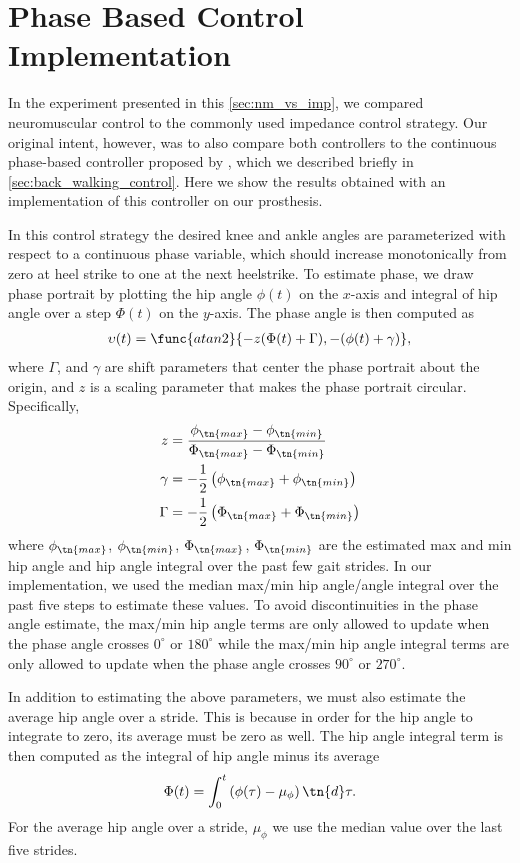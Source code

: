 \section{Phase Based Control Implementation}\label{sec:polar_phase}

In the experiment presented in this \cref{sec:nm_vs_imp}, we compared
neuromuscular control to the commonly used impedance control strategy. Our
original intent, however, was to also compare both controllers to the continuous
phase-based controller proposed by \citet{quintero2016preliminary}, which we
described briefly in \cref{sec:back_walking_control}. Here we show the results
obtained with an implementation of this controller on our prosthesis.

In this control strategy the desired knee and ankle angles are parameterized
with respect to a continuous phase variable, which should increase monotonically
from zero at heel strike to one at the next heelstrike. To estimate phase, we
draw phase portrait by plotting the hip angle $\phi(t)$ on the $x$-axis and
integral of hip angle over a step $\Phi(t)$ on the $y$-axis. The phase angle is
then computed as
\begin{align}
    \upsilon(t) = \func{atan2}{-z(\Phi(t) + \Gamma), -(\phi(t) + \gamma)},
\end{align}
where $\Gamma$, and $\gamma$ are shift parameters that center the phase portrait
about the origin, and $z$ is a scaling parameter that makes the phase portrait
circular. Specifically,
\begin{align}
    z &= \frac{\phi_\tn{max} - \phi_\tn{min}}{\Phi_\tn{max} - \Phi_\tn{min}} \\
    \gamma &= -\frac{1}{2} \left( \phi_\tn{max} + \phi_\tn{min} \right) \\
    \Gamma &= -\frac{1}{2} \left( \Phi_\tn{max} + \Phi_\tn{min} \right)
\end{align}
where $\phi_\tn{max}$, $\phi_\tn{min}$, $\Phi_\tn{max}$, $\Phi_\tn{min}$ are the
estimated max and min hip angle and hip angle integral over the past few gait
strides. In our implementation, we used the median max/min hip angle/angle
integral over the past five steps to estimate these values. To avoid
discontinuities in the phase angle estimate, the max/min hip angle terms are
only allowed to update when the phase angle crosses $0^\circ$ or $180^\circ$
while the max/min hip angle integral terms are only allowed to update when the
phase angle crosses $90^\circ$ or $270^\circ$.

In addition to estimating the above parameters, we must also estimate the
average hip angle over a stride. This is because in order for the hip angle to
integrate to zero, its average must be zero as well. The hip angle integral term
is then computed as the integral of hip angle minus its average
\begin{align}
    \Phi(t) = \int_0^t \left( \phi(\tau) - \mu_\phi \right) \tn{d}\tau.
\end{align}
For the average hip angle over a stride, $\mu_\phi$ we use the median value over
the last five strides.

